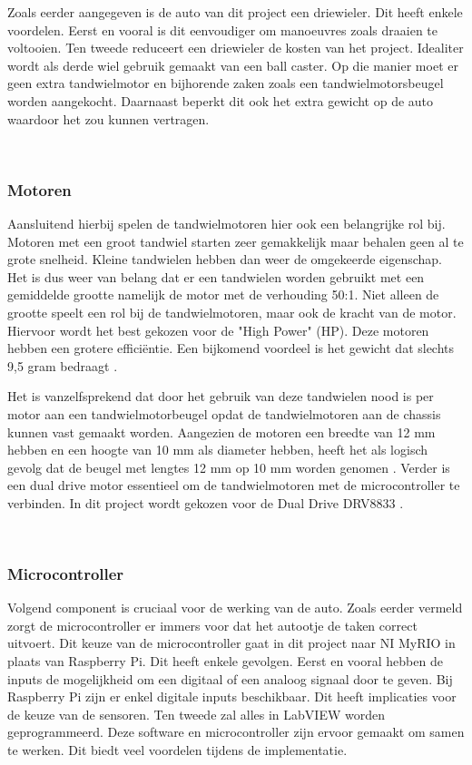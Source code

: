 \documentclass[a4paper,twoside,kulak]{kulakreport} %
\begin{document}
Zoals eerder aangegeven is de auto van dit project een driewieler. Dit heeft enkele voordelen. Eerst en vooral is dit eenvoudiger om manoeuvres zoals draaien te voltooien. Ten tweede reduceert een driewieler de kosten van het project. Idealiter wordt als derde wiel gebruik gemaakt van een ball caster. Op die manier moet er geen extra tandwielmotor en bijhorende zaken zoals een tandwielmotorsbeugel worden aangekocht. Daarnaast beperkt dit ook het extra gewicht op de auto waardoor het zou kunnen vertragen.

~

\subsubsection{Motoren}
Aansluitend hierbij spelen de tandwielmotoren hier ook een belangrijke rol bij. Motoren met een groot tandwiel starten zeer gemakkelijk maar behalen geen al te grote snelheid. Kleine tandwielen hebben dan weer de omgekeerde eigenschap. Het is dus weer van belang dat er een tandwielen worden gebruikt met een gemiddelde grootte namelijk de motor met de verhouding 50:1. Niet alleen de grootte speelt een rol bij de tandwielmotoren, maar ook de kracht van de motor. Hiervoor wordt het best gekozen voor de "High Power" (HP). Deze motoren hebben een grotere efficiëntie. Een bijkomend voordeel is het gewicht dat slechts 9,5 gram bedraagt \cite{MicroMetalGearMotor50:1HP}. %

Het is vanzelfsprekend dat door het gebruik van deze tandwielen nood is per motor aan een tandwielmotorbeugel opdat de tandwielmotoren aan de chassis kunnen vast gemaakt worden. Aangezien de motoren een breedte van 12 mm hebben en een hoogte van 10 mm als diameter hebben, heeft het als logisch gevolg dat de beugel met lengtes 12 mm op 10 mm worden genomen \cite{MicroMetalGearMotorBeugel}.
Verder is een dual drive motor essentieel om de tandwielmotoren met de microcontroller te verbinden. In dit project wordt gekozen voor de Dual Drive DRV8833 \cite{DualDriveDRV8833}. %


~
\subsubsection{Microcontroller}
Volgend component is cruciaal voor de werking van de auto. Zoals eerder vermeld zorgt de microcontroller er immers voor dat het autootje de taken correct uitvoert. Dit keuze van de microcontroller gaat in dit project naar NI MyRIO in plaats van Raspberry Pi. Dit heeft enkele gevolgen. 
Eerst en vooral hebben de inputs de mogelijkheid om een digitaal of een analoog signaal door te geven. Bij Raspberry Pi zijn er enkel digitale inputs beschikbaar. Dit heeft implicaties voor de keuze van de sensoren. Ten tweede zal alles in LabVIEW worden geprogrammeerd. Deze software en microcontroller zijn ervoor gemaakt om samen te werken. Dit biedt veel voordelen tijdens de implementatie. %
\end{document}
